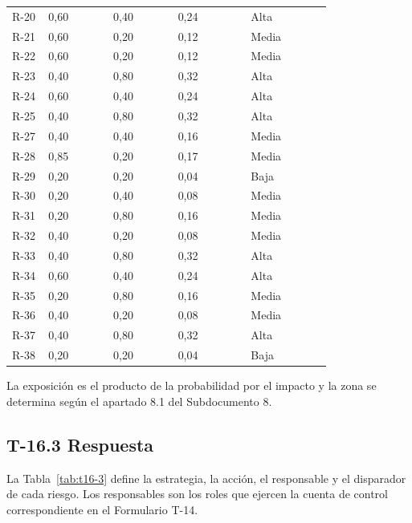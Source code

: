 \documentclass[11pt]{article}
\begin{document}
\begin{longtable}{p{0.090\linewidth}p{0.160\linewidth}p{0.160\linewidth}p{0.180\linewidth}p{0.200\linewidth}}
R-20 & 0,60 & 0,40 & 0,24 & Alta \\
R-21 & 0,60 & 0,20 & 0,12 & Media \\
R-22 & 0,60 & 0,20 & 0,12 & Media \\
R-23 & 0,40 & 0,80 & 0,32 & Alta \\
R-24 & 0,60 & 0,40 & 0,24 & Alta \\
R-25 & 0,40 & 0,80 & 0,32 & Alta \\
R-27 & 0,40 & 0,40 & 0,16 & Media \\
R-28 & 0,85 & 0,20 & 0,17 & Media \\
R-29 & 0,20 & 0,20 & 0,04 & Baja \\
R-30 & 0,20 & 0,40 & 0,08 & Media \\
R-31 & 0,20 & 0,80 & 0,16 & Media \\
R-32 & 0,40 & 0,20 & 0,08 & Media \\
R-33 & 0,40 & 0,80 & 0,32 & Alta \\
R-34 & 0,60 & 0,40 & 0,24 & Alta \\
R-35 & 0,20 & 0,80 & 0,16 & Media \\
R-36 & 0,40 & 0,20 & 0,08 & Media \\
R-37 & 0,40 & 0,80 & 0,32 & Alta \\
R-38 & 0,20 & 0,20 & 0,04 & Baja \\
\end{longtable}

La exposición es el producto de la probabilidad por el impacto y la zona se determina según el apartado 8.1 del Subdocumento 8.

\subsection{T-16.3 Respuesta}

La Tabla~\mbox{\ref{tab:t16-3}} define la estrategia, la acción, el responsable y el disparador de cada riesgo. Los responsables son los roles que ejercen la cuenta de control correspondiente en el Formulario T-14.
\end{document}
